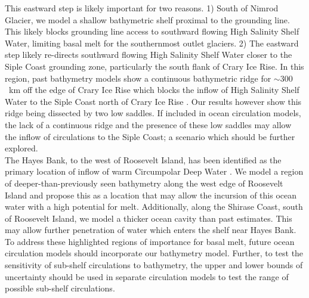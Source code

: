 This eastward step is likely important for two reasons. 1) South of Nimrod Glacier, we model a shallow bathymetric shelf proximal to the grounding line. This likely blocks grounding line access to southward flowing High Salinity Shelf Water, limiting basal melt for the southernmost outlet glaciers. 2) The eastward step likely re-directs southward flowing High Salinity Shelf Water closer to the Siple Coast grounding zone, particularly the south flank of Crary Ice Rise. In this region, past bathymetry models show a continuous bathymetric ridge for $\sim300$~km off the edge of Crary Ice Rise which blocks the inflow of High Salinity Shelf Water to the Siple Coast north of Crary Ice Rise \citep{tintoross2019}. Our results however show this ridge being dissected by two low saddles. If included in ocean circulation models, the lack of a continuous ridge and the presence of these low saddles may allow the inflow of circulations to the Siple Coast; a scenario which should be further explored. \\


The Hayes Bank, to the west of Roosevelt Island, has been identified as the primary location of inflow of warm Circumpolar Deep Water \citep{tintoross2019, dasmulti2020}. We model a region of deeper-than-previously seen bathymetry along the west edge of Roosevelt Island and propose this as a location that may allow the incursion of this ocean water with a high potential for melt. Additionally, along the Shirase Coast, south of Roosevelt Island, we model a thicker ocean cavity than past estimates. This may allow further penetration of water which enters the shelf near Hayes Bank. To address these highlighted regions of importance for basal melt, future ocean circulation models should incorporate our bathymetry model. Further, to test the sensitivity of sub-shelf circulations to bathymetry, the upper and lower bounds of uncertainty should be used in separate circulation models to test the range of possible sub-shelf circulations. 

